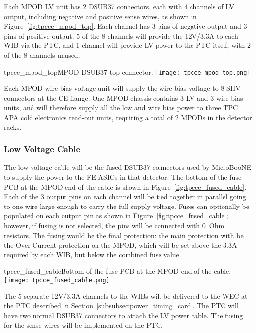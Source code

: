 Each MPOD LV unit has 2 DSUB37 connectors, each with 4 channels of LV output, including negative
and positive sense wires, as shown in Figure~\ref{fig:tpcce_mpod_top}. Each channel has 3 pins
of negative output and 3 pins of positive output. 5 of the 8 channels
will provide the 12V/3.3A to each WIB via the PTC, and 1 channel will provide LV power 
to the PTC itself, with 2 of the 8 channels unused.

\begin{cdrfigure}{tpcce_mpod_top}{MPOD DSUB37 top connector.}
\texttt{[image: tpcce\_mpod\_top.png]}
\end{cdrfigure}

Each MPOD wire-bias voltage unit will supply the wire bias voltage to 8 SHV connectors 
at the CE flange. One MPOD chassis contains 3 LV and 3 wire-bias units, and will therefore 
supply all the low and wire bias power to three TPC APA cold electronics read-out units, 
requiring a total of 2 MPODs in the detector racks.

%
\subsubsection{Low Voltage Cable}
\label{subsubsec:ce_feedthrough_lv}

The low voltage cable will be the fused DSUB37 connectors used by MicroBooNE to 
supply the power to the FE ASICs in that detector. The bottom of the fuse PCB at the MPOD 
end of the cable is shown in Figure~\ref{fig:tpcce_fused_cable}. Each of the 3 output pins on
each channel will be tied together in parallel 
going to one wire large enough to carry the full supply voltage. Fuses can optionally be 
populated on each output pin as shown in Figure~\ref{fig:tpcce_fused_cable}; however, if
fusing is not selected, the pins will be connected with 0~Ohm resistors. The fusing would be
the final protection: the main protection with be the Over Current protection
on the MPOD, which will be set above the 3.3A required by each WIB, but below the
combined fuse value.

\begin{cdrfigure}{tpcce_fused_cable}{Bottom of the fuse PCB at the MPOD end of the cable.}
\texttt{[image: tpcce\_fused\_cable.png]}
\end{cdrfigure}

The 5 separate 12V/3.3A channels to the WIBs will be delivered to the WEC at the PTC described
in Section~\ref{subsubsec:power_timing_card}. The PTC will have two normal DSUB37 connectors to
attach the LV power cable. The fusing for the sense wires will be implemented on the PTC.

